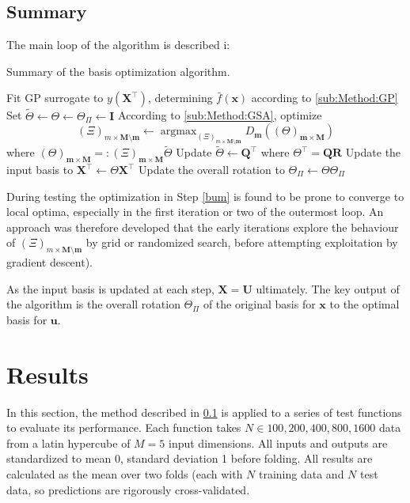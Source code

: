 \documentclass[preprint,12pt]{elsarticle}
\newcommand*{\M}[1]{\ensuremath{#1}\xspace}
\newcommand*{\vr}[1]{\M{\mathbf{#1}}}
\newcommand*{\deqr}{\M{=\mathrel{\mathop:}}}
\DeclareMathOperator*{\argmax}{argmax}
\begin{document}
        \subsection{Summary} \label{sub:Method:Summary}
            The main loop of the algorithm is described i:
            
            \begin{algorithm}
            \caption{Summary of the basis optimization algorithm.}
                \begin{algorithmic}[1]
                    \REPEAT
                        \STATE Fit GP surrogate to $y(\vr{X}^{\intercal})$, determining $\bar{f}(\vr{x})$ according to \cref{sub:Method:GP}
                        \STATE Set $\tilde{\Theta} \leftarrow \Theta \leftarrow \Theta_{\Pi} \leftarrow \vr{I}$
                            \STATE According to \cref{sub:Method:GSA}, optimize \label{bum}
                            $$(\Xi)_{m\times\vr{M}\setminus\vr{m}} \leftarrow \argmax_{(\Xi)_{m\times\vr{M}\setminus\vr{m}}} D_{\vr{m}}((\Theta)_{\vr{m}\times\vr{M}})$$
                            where $(\Theta)_{\vr{m}\times\vr{M}} \deqr (\Xi)_{\vr{m}\times\vr{M}} \tilde{\Theta}$
                            \STATE  Update $\tilde{\Theta} \leftarrow \vr{Q}^{\intercal}$ where $\Theta^{\intercal} = \vr{Q}\vr{R}$
                        \ENDFOR
                        \STATE Update the input basis to $\vr{X}^{\intercal} \leftarrow \Theta \vr{X}^{\intercal}$
                        \STATE Update the overall rotation to $\Theta_{\Pi} \leftarrow \Theta \Theta_{\Pi}$
                    \UNTIL{$\Theta \approx \vr{I}$}
                \end{algorithmic}
            \end{algorithm}

            During testing the optimization in Step \ref{bum} is found to be prone to converge to local optima, especially in the first iteration or two of the outermost loop. An approach was therefore developed that the early iterations explore the behaviour of \M{(\Xi)_{m\times\vr{M}\setminus\vr{m}}} by grid or randomized search, before attempting exploitation by gradient descent).

            As the input basis is updated at each step, \M{\vr{X} = \vr{U}} ultimately. 
            The key output of the algorithm is the overall rotation \M{\Theta_{\Pi}} of the original basis for \vr{x} to the optimal basis for \vr{u}.
                       
    \section{Results} \label{sec:Results}
        In this section, the method described in \cref{sub:Method:Summary} is applied to a series of test functions to evaluate its performance. Each function takes $N \in {100, 200, 400, 800, 1600}$ data from a latin hypercube of $M=5$ input dimensions. All inputs and outputs are standardized to mean 0, standard deviation 1 before folding.
        All results are calculated as the mean over two folds (each with $N$ training data and $N$ test data, so predictions are rigorously cross-validated. 
\end{document}
